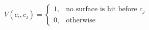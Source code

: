 \documentclass[border=6pt]{standalone}
\begin{document}
\color{white}
\(\displaystyle
V(c_i,c_j)=
\begin{cases}
1,&\text{no surface is hit before }c_j\\
0,&\text{otherwise}
\end{cases}
\)
\end{document}

